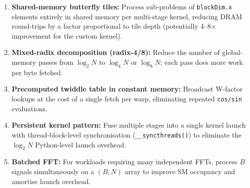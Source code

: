 \documentclass[12pt, letterpaper]{article}
\begin{document}
\begin{enumerate}
    \item \textbf{Shared-memory butterfly tiles:} Process sub-problems of \texttt{blockDim.x} elements entirely in shared memory per multi-stage kernel, reducing DRAM round-trips by a factor proportional to tile depth (potentially 4--8$\times$ improvement for the custom kernel).
    \item \textbf{Mixed-radix decomposition (radix-4/8):} Reduce the number of global-memory passes from $\log_2 N$ to $\log_4 N$ or $\log_8 N$; each pass does more work per byte fetched.
    \item \textbf{Precomputed twiddle table in constant memory:} Broadcast W-factor lookups at the cost of a single fetch per warp, eliminating repeated \texttt{cos/sin} evaluations.
    \item \textbf{Persistent kernel pattern:} Fuse multiple stages into a single kernel launch with thread-block-level synchronisation (\texttt{\_\_syncthreads()}) to eliminate the $\log_2 N$ Python-level launch overhead.
    \item \textbf{Batched FFT:} For workloads requiring many independent FFTs, process $B$ signals simultaneously on a $(B, N)$ array to improve SM occupancy and amortise launch overhead.
\end{enumerate}

\newpage
\printbibliography
\end{document}
